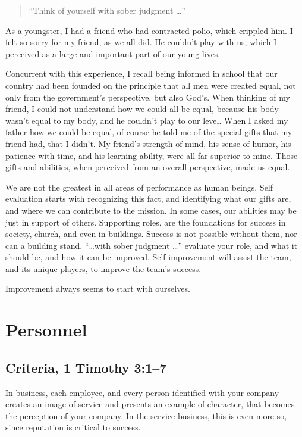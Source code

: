 \documentclass[12pt]{memoir}
\begin{document}
\begin{quote}
``Think of yourself with sober judgment \dots'' 
\end{quote}

As a youngster, I had a friend who had contracted polio, which crippled
him. I felt so sorry for my friend, as we all did. He couldn't play
with us, which I perceived as a large and important part of our young
lives.

Concurrent with this experience, I recall being informed in school
that our country had been founded on the principle that all men
were created equal, not only from the government's perspective,
but also God's. When thinking of my friend, I could not understand
how we could all be equal, because his body wasn't equal to my body,
and he couldn't play to our level. When I asked my father how we could
be equal, of course he told me of the special gifts that my friend
had, that I didn't. My friend's strength of mind, his sense of humor,
his patience with time, and his learning ability, were all far superior
to mine. Those gifts and abilities, when perceived from an overall
perspective, made us equal.

We are not the greatest in all areas of performance as human beings.
Self evaluation starts with recognizing this fact, and identifying
what our gifts are, and where we can contribute to the mission. In
some cases, our abilities may be just in support of others. Supporting
roles, are the foundations for success in society, church, and even
in buildings. Success is not possible without them, nor can a building
stand. ``\dots  with sober judgment \dots  '' evaluate your role,
and what it should be, and how it can be improved. Self improvement
will assist the team, and its unique players, to improve the team's
success.

Improvement always seems to start with ourselves.

\section{Personnel}

\subsection[Criteria]{Criteria, 1 Timothy 3:1--7}

In business, each employee, and every person identified with your company creates an image of service and presents an example of character, that becomes the perception of your company.
In the service business, this is even more so, since reputation is critical to success.
\end{document}
